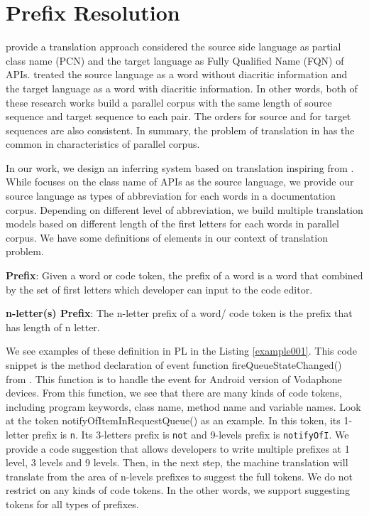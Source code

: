 \section{Prefix Resolution}
\cite{027,028} provide a translation approach considered the source side language as partial class name (PCN) and the target language as Fully Qualified Name (FQN) of APIs. \cite{029} treated the source language as a word without diacritic information and the target language as a word with diacritic information. In other words, both of these research works build a parallel corpus with the same length of source sequence and target sequence to each pair. The orders for source and for target sequences are also consistent. In summary, the problem of translation in \cite{027,028,029} has the common in characteristics of parallel corpus.

In our work, we design an inferring system based on translation inspiring from 
\cite{028}. While \cite{028} focuses on the class name of APIs as the source language, we provide our source language as types of abbreviation for each words in a documentation corpus. Depending on different level of abbreviation, we build multiple translation models based on different length of the first letters for each words in parallel corpus. We have some definitions of elements in our context of translation problem. 
\begin{definition}
    \label{def001}
  \textbf{Prefix}: Given a word or code token, the prefix of a word is a word that combined by the set of first letters which developer can input to the code editor. 
\end{definition}
\begin{definition}
\label{def002}
  \textbf{n-letter(s) Prefix}: The n-letter prefix of a word/ code token is the prefix that has length of n letter. 
\end{definition}

We see examples of these definition in PL in the Listing \ref{example001}. This code snippet is the method declaration of event function fireQueueStateChanged() from \cite{030}. This function is to handle the event for Android version of Vodaphone devices. From this function, we see that there are many kinds of code tokens, including program keywords, class name, method name and variable names. Look at the token notifyOfItemInRequestQueue() as an example. In this token, its 1-letter prefix is \texttt{n}. Its 3-letters prefix is \texttt{not} and 9-levels prefix is \texttt{notifyOfI}. We provide a code suggestion that allows developers to write multiple prefixes at 1 level, 3 levels and 9 levels. Then, in the next step, the machine translation will translate from the area of n-levels prefixes to suggest the full tokens. We do not restrict on any kinds of code tokens. In the other words, we support suggesting tokens for all types of prefixes. 

